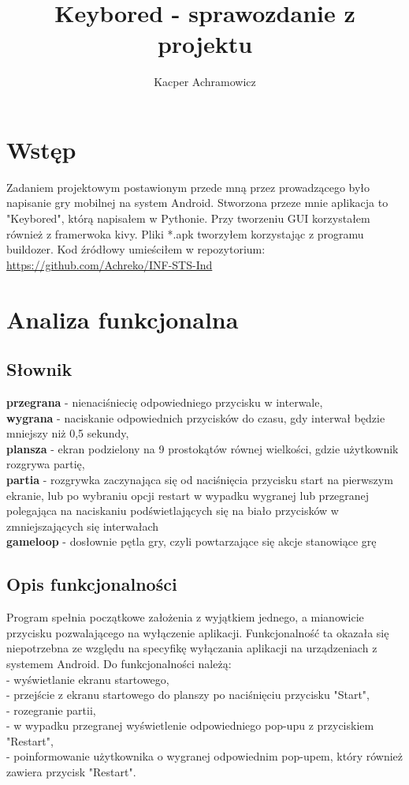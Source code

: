 \documentclass[11pt]{article}
\title{Keybored - sprawozdanie z projektu}
\author{Kacper Achramowicz}
\begin{document}
\maketitle

\tableofcontents
\clearpage

\section{Wstęp}
Zadaniem projektowym postawionym przede mną przez prowadzącego było napisanie gry mobilnej na system Android. Stworzona przeze mnie aplikacja to "Keybored", którą napisałem w Pythonie. Przy tworzeniu GUI korzystałem również z framerwoka kivy. Pliki *.apk tworzyłem korzystając z programu buildozer. Kod źródłowy umieściłem w repozytorium: \url{https://github.com/Achreko/INF-STS-Ind}
\section{Analiza funkcjonalna}
\subsection{Słownik}
\textbf{przegrana} - nienaciśniecię odpowiedniego przycisku w interwale, \\
\textbf{wygrana} - naciskanie odpowiednich przycisków do czasu, gdy interwał będzie mniejszy niż 0,5 sekundy, \\
\textbf{plansza} - ekran podzielony na 9 prostokątów równej wielkości, gdzie użytkownik rozgrywa partię, \\
\textbf{partia} - rozgrywka zaczynająca się od naciśnięcia przycisku start na pierwszym ekranie, lub po wybraniu opcji restart w wypadku wygranej lub przegranej polegająca na naciskaniu podświetlających się na biało przycisków w zmniejszających się interwałach\\
\textbf{gameloop} - dosłownie pętla gry, czyli powtarzające się akcje stanowiące grę
\subsection{Opis funkcjonalności}
Program spełnia początkowe założenia z wyjątkiem jednego, a mianowicie przycisku pozwalającego na wyłączenie aplikacji. Funkcjonalność ta okazała się niepotrzebna ze względu na specyfikę wyłączania aplikacji na urządzeniach z systemem Android. Do funkcjonalności należą:\\
- wyświetlanie ekranu startowego, \\
- przejście z ekranu startowego do planszy po naciśnięciu przycisku "Start", \\
- rozegranie partii, \\
- w wypadku przegranej wyświetlenie odpowiedniego pop-upu z przyciskiem "Restart",\\
- poinformowanie użytkownika o wygranej odpowiednim pop-upem, który również zawiera przycisk "Restart".
\end{document}
